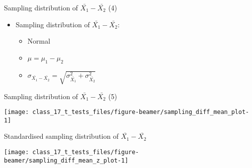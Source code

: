 \documentclass[
  ignorenonframetext,
]{beamer}
\providecommand{\tightlist}{%
  \setlength{\itemsep}{0pt}\setlength{\parskip}{0pt}}
\begin{document}
\begin{frame}{Sampling distribution of \(\bar{X_1} - \bar{X_2}\) (4)}
\label{sampling-distribution-of-barx_1---barx_2-4}
\begin{itemize}
\tightlist
\item
  Sampling distribution of \(\bar{X_1} - \bar{X_2}\):

  \begin{itemize}
  \tightlist
  \item
    Normal
  \item
    \(\mu = \mu_1 - \mu_2\)
  \item
    \(\sigma_{\bar{X_1} - \bar{X_2}} = \sqrt{\sigma^2_{\bar{X_1}} + \sigma^2_{\bar{X_2}}}\)
  \end{itemize}
\end{itemize}
\end{frame}

\begin{frame}{Sampling distribution of \(\bar{X_1} - \bar{X_2}\) (5)}
\label{sampling-distribution-of-barx_1---barx_2-5}
\begin{center}\texttt{[image: class\_17\_t\_tests\_files/figure-beamer/sampling\_diff\_mean\_plot-1]} \end{center}
\end{frame}

\begin{frame}{Standardised sampling distribution of
\(\bar{X_1} - \bar{X_2}\)}
\label{standardised-sampling-distribution-of-barx_1---barx_2}
\begin{center}\texttt{[image: class\_17\_t\_tests\_files/figure-beamer/sampling\_diff\_mean\_z\_plot-1]} \end{center}
\end{frame}
\end{document}
